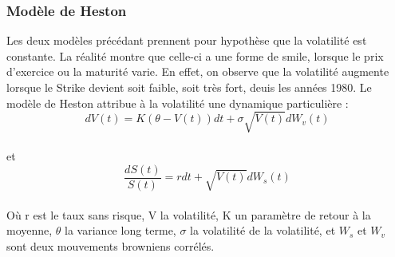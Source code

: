 \documentclass[french,12pt,a4paper]{article}
\begin{document}
\subsubsection{Modèle de Heston}
Les deux modèles précédant prennent pour hypothèse que la volatilité est constante. La réalité montre que celle-ci a une forme de smile, lorsque le prix d'exercice ou la maturité varie. En effet, on observe que la volatilité augmente lorsque le Strike devient soit faible, soit très fort, deuis les années 1980. Le modèle de Heston attribue à la volatilité une dynamique particulière : \\
$$ dV(t) = K(\theta - V(t))dt + \sigma \sqrt{V(t)} dW_{v}(t) $$ \\
et \\
$$ \frac{dS(t)}{S(t)} = rdt + \sqrt{V(t)}dW_{s}(t) $$ \\
Où r est le taux sans risque, V la volatilité, K un paramètre de retour à la moyenne, $\theta$ la variance long terme, $\sigma$ la volatilité de la volatilité, et $W_{s}$ et $W_{v}$ sont deux mouvements browniens corrélés.\\
\end{document}

